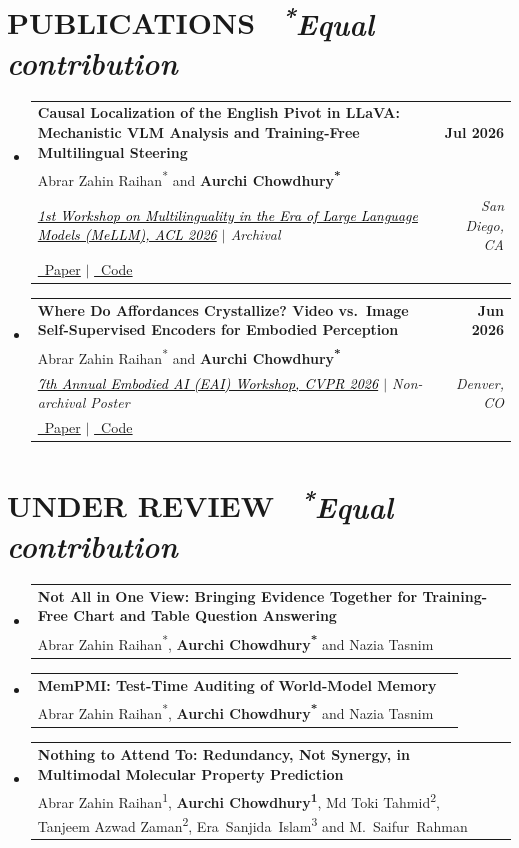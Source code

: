 \documentclass[letterpaper,11pt]{article}
\makeatletter
\newcommand{\resumeSubHeadingListStart}{\begin{itemize}[leftmargin=0.0in, label={}]}
\newcommand{\resumeSubHeadingListEnd}{\end{itemize}}
\newcommand{\resumePublication}[6]{
  \vspace{-2pt}\item
    \begin{tabular*}{1.0\textwidth}[t]{>{\raggedright\arraybackslash}p{0.85\textwidth}@{\extracolsep{\fill}}r}
      \textbf{#1} & \textbf{\small #2} \\
      \small #3 & \\
      \textit{\small #4} & \textit{\small #5} \\
      \small #6 & \\
    \end{tabular*}\vspace{2pt}
}
\newcommand{\resumeUnderReview}[2]{
  \vspace{-2pt}\item
    \begin{tabular*}{1.0\textwidth}[t]{>{\raggedright\arraybackslash}p{0.85\textwidth}@{\extracolsep{\fill}}r}
      \textbf{#1} & \\
      \small #2 & \\
    \end{tabular*}\vspace{2pt}
}
\makeatother
\begin{document}
\section{\texorpdfstring{PUBLICATIONS \ {\normalfont\footnotesize\itshape\textsuperscript{*}Equal contribution}}{PUBLICATIONS}}
  \resumeSubHeadingListStart
    \resumePublication
      {Causal Localization of the English Pivot in LLaVA: Mechanistic VLM Analysis and Training-Free Multilingual Steering}
      {Jul 2026}
      {Abrar Zahin Raihan\textsuperscript{*} and \textbf{Aurchi Chowdhury\textsuperscript{*}}}
      {\href{https://mellm.org/}{\textcolor{black}{1st Workshop on Multilinguality in the Era of Large Language Models (MeLLM), ACL 2026}} $|$ Archival}
      {San Diego, CA}
      {\href{https://aclanthology.org/2026.mellm-1.25/}{\raisebox{-0.2\height}\faFilePdf\ Paper} $|$ \href{https://github.com/azraihan/mul-vlm-mech-interp}{\raisebox{-0.2\height}\faGithub\ Code}}
    \resumePublication
      {Where Do Affordances Crystallize? Video vs.\ Image Self-Supervised Encoders for Embodied Perception}
      {Jun 2026}
      {Abrar Zahin Raihan\textsuperscript{*} and \textbf{Aurchi Chowdhury\textsuperscript{*}}}
      {\href{https://embodied-ai.org/cvpr2026/}{\textcolor{black}{7th Annual Embodied AI (EAI) Workshop, CVPR 2026}} $|$ Non-archival Poster}
      {Denver, CO}
      {\href{https://embodied-ai.org/papers/2026/32_Where_Do_Affordances_Crysta.pdf}{\raisebox{-0.2\height}\faFilePdf\ Paper} $|$ \href{https://github.com/azraihan/affordance_crystallization}{\raisebox{-0.2\height}\faGithub\ Code}}
  \resumeSubHeadingListEnd
\vspace{-5pt}

\section{\texorpdfstring{UNDER REVIEW \ {\normalfont\footnotesize\itshape\textsuperscript{*}Equal contribution}}{UNDER REVIEW}}
  \resumeSubHeadingListStart
    \resumeUnderReview
      {Not All in One View: Bringing Evidence Together for Training-Free Chart and Table Question Answering}
      {Abrar Zahin Raihan\textsuperscript{*}, \textbf{Aurchi Chowdhury\textsuperscript{*}} and Nazia Tasnim}
    \resumeUnderReview
      {MemPMI: Test-Time Auditing of World-Model Memory}
      {Abrar Zahin Raihan\textsuperscript{*}, \textbf{Aurchi Chowdhury\textsuperscript{*}} and Nazia Tasnim}
    \resumeUnderReview
      {Nothing to Attend To: Redundancy, Not Synergy, in Multimodal Molecular Property Prediction}
      {Abrar Zahin Raihan\textsuperscript{1}, \textbf{Aurchi Chowdhury\textsuperscript{1}}, Md Toki Tahmid\textsuperscript{2}, Tanjeem Azwad Zaman\textsuperscript{2}, \mbox{Era Sanjida Islam\textsuperscript{3}} and \mbox{M.\ Saifur Rahman}}
  \resumeSubHeadingListEnd
\vspace{-5pt}
\end{document}
